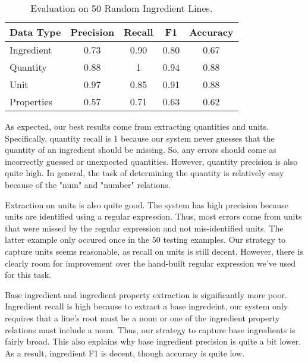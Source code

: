 \documentclass[11pt]{article}
\begin{document}
\begin{table}[h]
\begin{center}
\begin{tabular}{|l|cc|c|c|}
\hline\bf Data Type & \bf Precision & \bf Recall &  \bf F1 & \bf Accuracy\\ \hline
Ingredient & 0.73 & 0.90 & 0.80 &0.67 \\
Quantity & 0.88 & 1 & 0.94 & 0.88 \\
Unit & 0.97 & 0.85 & 0.91 & 0.88 \\
Properties & 0.57 & 0.71 & 0.63 & 0.62 \\
\hline
\end{tabular}
\end{center}
\caption{\label{font-table}Evaluation on 50 Random Ingredient Lines. }
\end{table}

As expected, our best results come from extracting quantities and units. Specifically, quantity recall is 1 because our system never guesses that the quantity of an ingredient should be missing. So, any errors should come as incorrectly guessed or unexpected quantities. However, quantity precision is also quite high. In general, the task of determining the quantity is relatively easy because of the "num" and "number" relations. 

Extraction on units is also quite good. The system has high precision because units are identified using a regular expression. Thus, most errors come from units that were missed by the regular expression and not mis-identified units. The latter example only occured once in the 50 testing examples. Our strategy to capture units seems reasonable, as recall on units is still decent. However, there is clearly room for improvement over the hand-built regular expression we've used for this task. 

Base ingredient and ingredient property extraction is significantly more poor. Ingredient recall is high because to extract a base ingredeint, our system only requires that a line's root must be a noun or one of the ingredient property relations must include a noun. Thus, our strategy to capture base ingredients is fairly broad. This also explains why base ingredient precision is quite a bit lower. As a result, ingredient F1 is decent, though accuracy is quite low.
\end{document}
